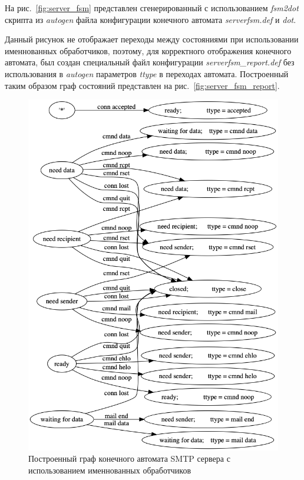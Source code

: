 \documentclass[a4paper,12pt]{report}
\begin{document}
На рис.~\ref{fig:server_fsm} представлен сгенерированный с использованием \textit{fsm2dot} скрипта из \textit{autogen}
файла конфигурации конечного автомата \textit{serverfsm.def} и \textit{dot}.

Данный рисунок не отображает переходы между состояниями при использовании именнованных обработчиков,
поэтому, для корректного отображения конечного автомата, был создан специальный файл конфигурации
\textit{serverfsm_report.def} без использования в \textit{autogen} параметров \textit{ttype} в переходах автомата.
Построенный таким образом граф состояний представлен на рис.~\ref{fig:server_fsm_report}.

\begin{figure}
    \centering
    \includegraphics[width=\textwidth]{../images/serverfsm.png}
    \caption{Построенный граф конечного автомата SMTP сервера с использованием именнованных обработчиков}
    \label{fig:serverfsm_def}
\end{figure}
\end{document}
